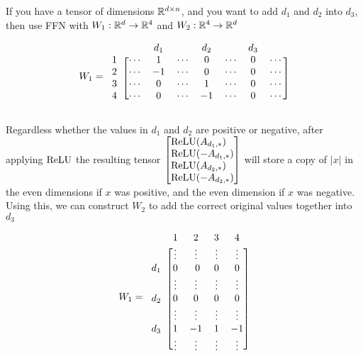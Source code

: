     If you have a tensor of dimensions $\mathbb{R}^{d\times n}$, and you want to add
    $d_1$ and $d_2$ into $d_3$, then use FFN with $W_1:\mathbb{R}^d\to \mathbb{R}^4$ and $W_2:\mathbb{R}^4\to \mathbb{R}^d$

    \begin{equation*}
        W_1=
        \begin{blockarray}{cccccccc}
            & & d_1 & & d_2 & & d_3 & \\
            \begin{block}{c[ccccccc]}
                    1& \cdots & 1 & \cdots & 0 & \cdots & 0 & \cdots \\
                    2& \cdots & -1 & \cdots & 0 & \cdots & 0 & \cdots \\
                    3& \cdots & 0 & \cdots & 1 & \cdots & 0 & \cdots \\
                    4& \cdots & 0 & \cdots & -1 & \cdots & 0 & \cdots \\
            \end{block}
        \end{blockarray}
    \end{equation*}

    Regardless whether the values in $d_1$ and $d_2$ are positive or negative, after applying $\text{ReLU}$ the resulting tensor $\begin{bmatrix}
        \ReLU(A_{d_1,*})\phantom- \\
        \ReLU(-A_{d_1,*})\\
        \ReLU(A_{d_2,*})\phantom- \\
        \ReLU(-A_{d_2,*})\\
    \end{bmatrix}$ will store a copy of $|x|$ in the even dimensions if $x$ was positive, and the even dimension if $x$ was negative. Using this, we can construct $W_2$ to add the correct original values together into $d_3$

    \begin{equation*}
    W_1=
    \begin{blockarray}{ccccc}
        & 1& 2& 3&4 \\
        \begin{block}{c[cccc]}
                & \vdots &\vdots & \vdots & \vdots \\
                d_1 & 0 &\ 0 & 0 & 0 \\
                & \vdots &\vdots & \vdots & \vdots \\
                d_2 & 0 & 0 & 0 & 0 \\
                & \vdots &\vdots & \vdots & \vdots \\
                d_3 & 1  & -1 & 1 & -1 \\
                & \vdots &\vdots & \vdots & \vdots \\
        \end{block}
    \end{blockarray}
    \end{equation*}

